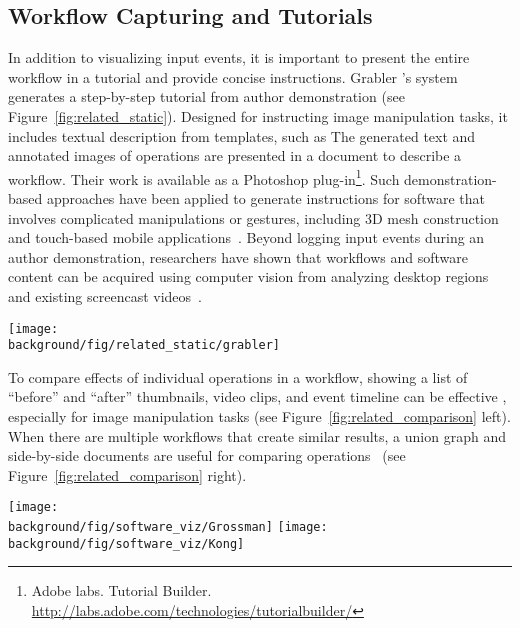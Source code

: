 \subsection{Workflow Capturing and Tutorials}
In addition to visualizing input events, it is important to present the entire workflow in a tutorial and provide concise instructions.
%
Grabler \ea{}'s system~\cite{Grabler:2009jj} generates a step-by-step tutorial from author demonstration (see Figure~\ref{fig:related_static}). Designed for instructing image manipulation tasks, it includes textual description from templates, such as  The generated text and annotated images of operations are presented in a document to describe a workflow. Their work is available as a Photoshop plug-in\footnote{Adobe labs. Tutorial Builder. \url{http://labs.adobe.com/technologies/tutorialbuilder/}}.
%
Such demonstration-based approaches have been applied to generate instructions for software that involves complicated manipulations or gestures, including 3D mesh construction~\cite{Denning:2011fy} and touch-based mobile applications~\cite{Wang:2014:EAC:2556288.2557407}.
%
Beyond logging input events during an author demonstration, researchers have shown that workflows and software content can be acquired using computer vision from analyzing desktop regions~\cite{Yeh:2009dh,Chang:2011vd} and existing screencast videos~\cite{Banovic:2012kd}.

\begin{figure*}[t!]
  \centering
  \texttt{[image: \\background/fig/related\_static/grabler]}
  \caption{Example static tutorial automatically generated by Grabler \ea{}'s system~\cite{Grabler:2009jj}.}
  \label{fig:related_static}
\end{figure*}

To compare effects of individual operations in a workflow, showing a list of ``before'' and ``after'' thumbnails, video clips, and event timeline can be effective \cite{Grossman:2010jz}, especially for image manipulation tasks (see Figure~\ref{fig:related_comparison} left).
%
When there are multiple workflows that create similar results, a union graph and side-by-side documents are useful for comparing operations~\cite{Kong:2012:DTR:2207676.2208549} (see Figure~\ref{fig:related_comparison} right).

\begin{figure*}[t!]
  \centering
  \texttt{[image: \\background/fig/software\_viz/Grossman]}
  \texttt{[image: \\background/fig/software\_viz/Kong]}
  \caption{Instructional systems that help learners compare effects and similar tutorials using (left) before and after images (a) and event timeline (b) by Grossman \ea{}~\cite{Grossman:2010jz} and (right) operation union graph by Kong \ea{}~\cite{Kong:2012:DTR:2207676.2208549}.}
  \label{fig:related_comparison}
\end{figure*}

